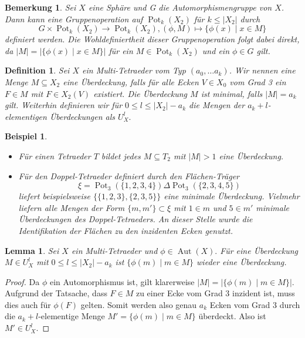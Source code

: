 \documentclass[12pt,titlepage,twoside,cleardoublepage]{article}
\theoremstyle{nummermitklammern}
\newtheorem{lemma}[temp]{Lemma}
\newtheorem{bsp}[temp]{Beispiel}
\newtheorem{definition}[temp]{Definition}
\newtheorem{bemerkung}[temp]{Bemerkung}
\newtheorem{definition}[zahl]{Definition}
\newtheorem{lemma}[zahl]{Lemma}
\newtheorem{bsp}[zahl]{Beispiel}
\newtheorem{bemerkung}[zahl]{Bemerkung}
\numberwithin{equation}{section}
\DeclareMathOperator{\Aut}{Aut}
\DeclareMathOperator{\Pot}{Pot}
\begin{document}
\begin{bemerkung}\label{bemgruppe}
Sei $X$ eine Sphäre und G die Automorphismengruppe von $X$. Dann kann eine Gruppenoperation auf $\Pot_k(X_2)$ für $k \leq \vert X_2 \vert  $ durch 
\[
G\times \Pot_k(X_2) \to \Pot_k(X_2),(\phi , M)\mapsto \{\phi(x)\mid x\in M\}
\]
definiert werden. Die Wohldefiniertheit dieser Gruppenoperation folgt dabei direkt, da $\vert M\vert=\vert\{\phi (x)\mid x\in M\}\vert$ für ein $M\in \Pot_k(X_2)$ und ein $\phi\in G$ gilt.
\end{bemerkung}
\begin{definition}
Sei $X$ ein Multi-Tetraeder vom Typ $(a_0,\ldots a_k)$. Wir nennen eine Menge $M\subseteq X_2$ eine \emph{Überdeckung}, falls für alle Ecken $V\in X_0$ vom Grad 3 ein $F\in M$ mit $F\in X_2(V)$ existiert. Die Überdeckung $M$ ist \emph{minimal}, falls $\vert M\vert=a_k$ gilt.
Weiterhin definieren wir für $0\leq l\leq \vert X_2\vert -a_k$ die Mengen der $a_k+l$-elementigen Überdeckungen als
 $U_X^l.$ 
\end{definition}
\begin{bsp}
\begin{itemize}
\item Für einen Tetraeder $T$ bildet jedes $M\subseteq T_2$ mit $\vert M\vert >1 $ eine Überdeckung. 
\item Für den Doppel-Tetraeder definiert durch den Flächen-Träger 
\[
\xi=\Pot_3(\{1,2,3,4\})\Delta \Pot_3(\{2,3,4,5\})
\]
liefert beispielsweise $\{\{1,2,3\},\{2,3,5\}\}$ eine minimale Überdeckung. Vielmehr liefern alle Mengen der Form $\{m,m'\}\subset \xi$ mit $1\in m$ und $5\in m'$ minimale Überdeckungen des Doppel-Tetraeders. An dieser Stelle wurde die Identifikation der Flächen zu den inzidenten Ecken genutzt.
\end{itemize}
\end{bsp}
\begin{lemma}
Sei $X$ ein Multi-Tetraeder und $\phi \in \Aut(X).$ Für eine Überdeckung $M\in U_X^l$ mit  $0\leq l\leq \vert X_2\vert -a_k$ ist $\{\phi(m)\mid m\in M\}$ wieder eine Überdeckung. \end{lemma}
\begin{proof}
 Da $\phi$ ein Automorphismus ist, gilt
klarerweise $\vert M\vert =\vert\{\phi(m)\mid m\in M\}\vert$.
 Aufgrund der Tatsache, dass $F\in M$ zu einer Ecke vom Grad 3 inzident ist, muss dies auch für $\phi(F)$ gelten. Somit werden also genau $a_k$ Ecken vom Grad 3 durch die $a_k+l$-elementige Menge $M'=\{\phi(m)\mid m\in M\}$ überdeckt. Also ist $M'\in U^l_X.$
\end{proof}
\end{document}
